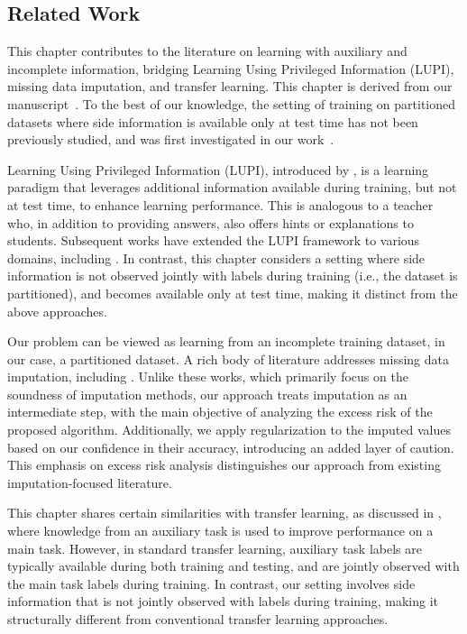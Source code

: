 \subsection{Related Work}

This chapter contributes to the literature on learning with auxiliary and incomplete information, bridging Learning Using Privileged Information (LUPI), missing data imputation, and transfer learning. This chapter is derived from our manuscript~\cite{singh2026side_journal}. To the best of our knowledge, the setting of training on partitioned datasets where side information is available only at test time has not been previously studied, and was first investigated in our work~\cite{singh2026side_journal}.

Learning Using Privileged Information (LUPI), introduced by \cite{vapnik2009new}, is a learning paradigm that leverages additional information available during training, but not at test time, to enhance learning performance. This is analogous to a teacher who, in addition to providing answers, also offers hints or explanations to students.
Subsequent works have extended the LUPI framework to various domains, including \cite{vapnik2015learning, sacco2021neural, song2021learning, wang2018learning}. In contrast, this chapter considers a setting where side information is not observed jointly with labels during training (i.e., the dataset is partitioned), and becomes available only at test time, making it distinct from the above approaches.

Our problem can be viewed as learning from an incomplete training dataset, in our case, a partitioned dataset. A rich body of literature addresses missing data imputation, including \cite{bertsimas2018predictive, van2007multiple, ghahramani1993supervised, stekhoven2012missforest, nguyen2023imputation}. Unlike these works, which primarily focus on the soundness of imputation methods, our approach treats imputation as an intermediate step, with the main objective of analyzing the excess risk of the proposed algorithm. Additionally, we apply regularization to the imputed values based on our confidence in their accuracy, introducing an added layer of caution. This emphasis on excess risk analysis distinguishes our approach from existing imputation-focused literature.

This chapter shares certain similarities with transfer learning, as discussed in \cite{hosna2022transfer}, where knowledge from an auxiliary task is used to improve performance on a main task. However, in standard transfer learning, auxiliary task labels are typically available during both training and testing, and are jointly observed with the main task labels during training. In contrast, our setting involves side information that is not jointly observed with labels during training, making it structurally different from conventional transfer learning approaches.

